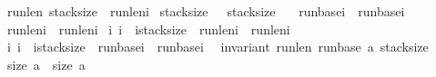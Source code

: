 \begin{isabellebody}
{\isacharparenleft}{\isasymacute}run{\isacharunderscore}len{\isacharbang}{\isacharparenleft}\ \isactrlbsup {\isasymsigma}\isactrlesup stack{\isacharunderscore}size{\isacharparenright}\ {\isacharequal}\ {\isasymacute}run{\isacharunderscore}len{\isacharunderscore}i{\isacharparenright}\ {\isasymand}\isanewline
{\isacharparenleft}{\isasymacute}stack{\isacharunderscore}size\ {\isacharequal}\ \ \isactrlbsup {\isasymsigma}\isactrlesup stack{\isacharunderscore}size\ {\isacharplus}\ {}{\isacharparenright}\ {\isasymand}\isanewline
{\isacharparenleft}{\isasymacute}run{\isacharunderscore}base{\isacharunderscore}i\ {\isacharequal}\ \isactrlbsup {\isasymsigma}\isactrlesup run{\isacharunderscore}base{\isacharunderscore}i{\isacharparenright}\ {\isasymand}\isanewline
{\isacharparenleft}{\isasymacute}run{\isacharunderscore}len{\isacharunderscore}i\ {\isacharequal}\ \isactrlbsup {\isasymsigma}\isactrlesup run{\isacharunderscore}len{\isacharunderscore}i{\isacharparenright}\ {\isasymand}\isanewline
{\isacharparenleft}{\isasymforall}i{\isachardot}\ {\isacharparenleft}i{\isasymge}{}\ {\isasymand}\ i{\isacharless}{\isasymacute}stack{\isacharunderscore}size{\isacharminus}{}{\isacharparenright}\ {\isasymlongrightarrow}\ {\isacharparenleft}{\isasymacute}run{\isacharunderscore}len{\isacharbang}i\ {\isacharequal}\ \isactrlbsup {\isasymsigma}\isactrlesup run{\isacharunderscore}len{\isacharbang}i{\isacharparenright}{\isacharparenright}\ {\isasymand}\isanewline
{\isacharparenleft}{\isasymforall}i{\isachardot}\ {\isacharparenleft}i{\isasymge}{}\ {\isasymand}\ i{\isacharless}{\isasymacute}stack{\isacharunderscore}size{\isacharminus}{}{\isacharparenright}\ {\isasymlongrightarrow}\ {\isacharparenleft}{\isasymacute}run{\isacharunderscore}base{\isacharbang}i\ {\isacharequal}\ \isactrlbsup {\isasymsigma}\isactrlesup run{\isacharunderscore}base{\isacharbang}i{\isacharparenright}{\isacharparenright}\ {\isasymand}\ \isanewline
{\isacharparenleft}invariant\ {\isasymacute}run{\isacharunderscore}len\ {\isasymacute}run{\isacharunderscore}base\ {\isasymacute}a\ {\isasymacute}stack{\isacharunderscore}size{\isacharparenright}\ {\isasymand}\isanewline
{\isacharparenleft}size\ {\isasymacute}a\ {\isacharequal}\ size\ \isactrlbsup {\isasymsigma}\isactrlesup a{\isacharparenright}\ {\isasymrbrace}{\isachardoublequoteclose}\isanewline
%
\isadelimproof
\ \ %
\endisadelimproof
%
\isatagproof
{}\isamarkupfalse%
%
\endisatagproof
{\isafoldproof}%
%
\isadelimproof
\isanewline
%
\endisadelimproof
\isanewline
\isanewline
{}\isamarkupfalse%

\end{isabellebody}
